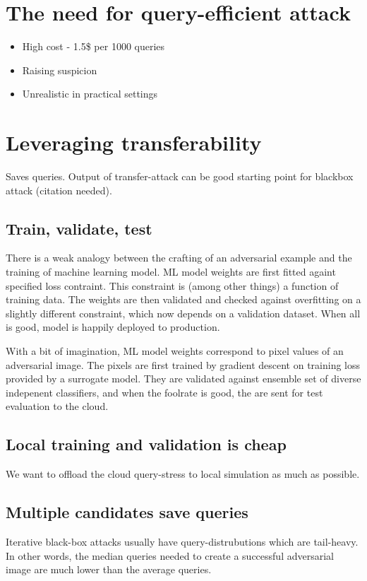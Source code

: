 \section{The need for query-efficient attack}


\begin{itemize}
    \item{High cost - 1.5\$ per 1000 queries}
    \item{Raising suspicion}
    \item{Unrealistic in practical settings}
\end{itemize}

\section{Leveraging transferability}
Saves queries. Output of transfer-attack can be good starting point for blackbox attack (citation needed).

\subsection{Train, validate, test}
There is a weak analogy between the crafting of an adversarial example and the training of machine learning model. ML model weights are first fitted againt specified loss contraint. This constraint is (among other things) a function of training data. The weights are then validated and checked against overfitting on a slightly different constraint, which now depends on a validation dataset. When all is good, model is happily deployed to production.

With a bit of imagination, ML model weights correspond to pixel values of an adversarial image. The pixels are first trained by gradient descent on training loss provided by a surrogate model. They are validated against ensemble set of diverse indepenent classifiers, and when the foolrate is good, the are sent for test evaluation to the cloud. 

\subsection{Local training and validation is cheap}
We want to offload the cloud query-stress to local simulation as much as possible.

\subsection{Multiple candidates save queries}
Iterative black-box attacks usually have query-distrubutions which are tail-heavy. In other words, the median queries needed to create a successful adversarial image are much lower than the average queries.


